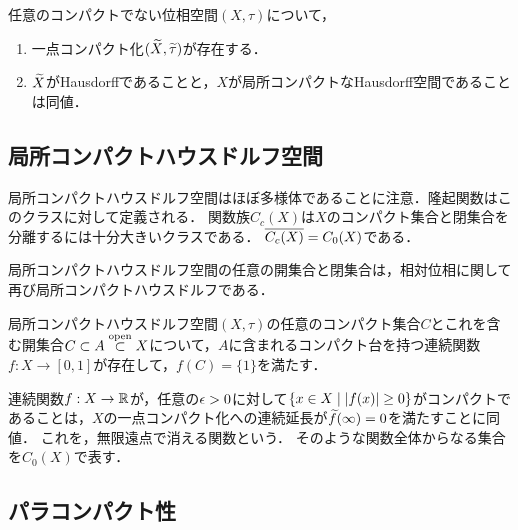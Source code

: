 \documentclass[uplatex,dvipdfmx]{jsreport}
\begin{document}
\begin{proposition}
    任意のコンパクトでない位相空間$(X,\tau)$について，
    \begin{enumerate}
        \item 一点コンパクト化$(\widetilde{X},\widetilde{\tau})$が存在する．
        \item $\widetilde{X}$がHausdorffであることと，$X$が局所コンパクトなHausdorff空間であることは同値．
    \end{enumerate}
\end{proposition}

\subsection{局所コンパクトハウスドルフ空間}

\begin{tcolorbox}[colframe=ForestGreen, colback=ForestGreen!10!white,breakable,colbacktitle=ForestGreen!40!white,coltitle=black,fonttitle=\bfseries\sffamily,
title=]
    局所コンパクトハウスドルフ空間はほぼ多様体であることに注意．隆起関数はこのクラスに対して定義される．
    関数族$C_c(X)$は$X$のコンパクト集合と閉集合を分離するには十分大きいクラスである．
    $\overline{C_c(X)}=C_0(X)$である．
\end{tcolorbox}

\begin{proposition}
    局所コンパクトハウスドルフ空間の任意の開集合と閉集合は，相対位相に関して再び局所コンパクトハウスドルフである．
\end{proposition}

\begin{proposition}[隆起関数の存在]
    局所コンパクトハウスドルフ空間$(X,\tau)$の任意のコンパクト集合$C$とこれを含む開集合$C\subset A\overset{\mathrm{open}}{\subset} X$について，$A$に含まれるコンパクト台を持つ連続関数$f:X\to[0,1]$が存在して，$f(C)=\{1\}$を満たす．
\end{proposition}

\begin{definition}\label{def-functions-vanish-at-infinity}
    連続関数$f:X\to\mathbb{R}$が，任意の$\epsilon>0$に対して$\left\{x\in X\mid\lvert f(x)\rvert\ge 0\right\}$がコンパクトであることは，$X$の一点コンパクト化への連続延長が$\widetilde{f}(\infty)=0$を満たすことに同値．
    これを，無限遠点で消える関数という．
    そのような関数全体からなる集合を$C_0(X)$で表す．
\end{definition}


\subsection{パラコンパクト性}
\end{document}
